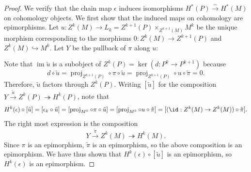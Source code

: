 \begin{proof}
    We verify that the chain map $\epsilon$ induces isomorphisms $H^{*} (P) \xrightarrow{\sim} H^{*}(M)$ on cohomology objects. We first show that the induced maps on cohomology are epimorphisms. Let $u:Z^k(M) \to L_k = Z^{k+1}(P) \times_{Z^{k+1}(M)} M^k$ be the unique morphism corresponding to the morphisms $0: Z^k(M) \to Z^{k+1}(P)$ and $Z^k(M) \hookrightarrow M^k$. Let $Y$ be the pullback of $\pi$ along $u$:
    \begin{center}
    \end{center}
    Note that $\operatorname{im} \tilde{u}$ is a subobject of $Z^k(P) = \ker(d: P^k \to P^{k+1})$ because
    $$d \circ \tilde{u} = \operatorname{proj}_{Z^{k+1}(P)} \circ \pi \circ \tilde{u} = \operatorname{proj}_{Z^{k+1}(P)} \circ u \circ \tilde{\pi} = 0.$$
    Therefore, $\tilde{u}$ factors through $Z^k(P)$. Writing $[\tilde{u}]$ for the composition $Y \xrightarrow{\tilde{u}} Z^k(P) \twoheadrightarrow H^k(P)$, note that 
    $$H^k(\epsilon) \circ [\tilde{u}] = [\epsilon_k \circ \tilde{u}] = [\operatorname{proj}_{M^k} \circ \pi \circ \tilde{u}] = [\operatorname{proj}_{M^k} \circ u \circ \tilde{\pi}] = [(\id: Z^k(M) \to Z^k(M)) \circ \tilde{\pi}].$$
    The right most expression is the composition 
    $$Y \xrightarrow{\tilde{\pi}} Z^k(M) \twoheadrightarrow H^k(M).$$
    Since $\pi$ is an epimorphism, $\tilde{\pi}$ is an epimorphism, so the above composition is an epimorphism. We have thus shown that $H^k(\epsilon) \circ [\tilde{u}]$ is an epimorphism, so $H^k(\epsilon)$ is an epimorphism.


\end{proof}
